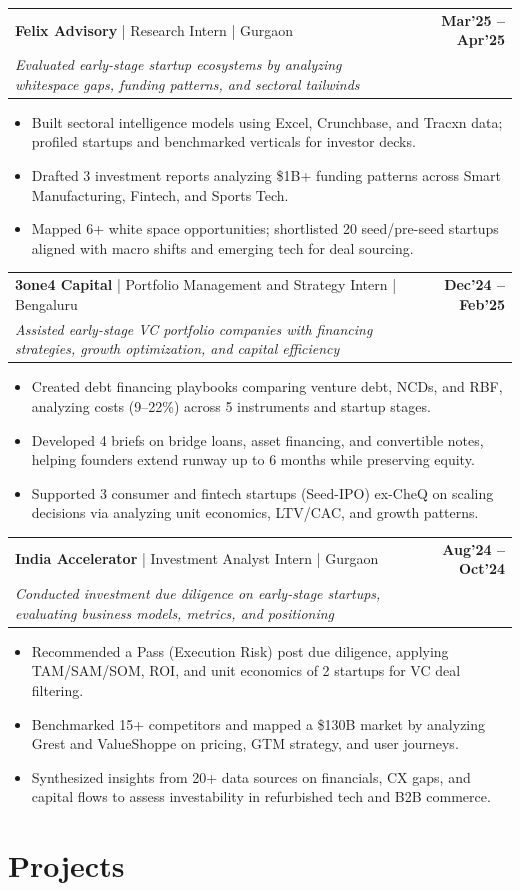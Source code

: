 \documentclass[10pt, a4paper]{article}
\makeatletter
\newcommand{\jobheader}[4]{
  \vspace{-1pt}
  \begin{tabular*}{\textwidth}[t]{l@{\extracolsep{\fill}}r}
    \textbf{#1} \quad | \quad #3 & \textbf{\small #4} \\
    \textit{\small #2} & \\
  \end{tabular*}
  \vspace{-2pt}
}
\newenvironment{achievelist}{
  \begin{itemize}[leftmargin=1.2em, itemsep=0.5pt, parsep=0pt, topsep=1pt]
    \small
}{
  \end{itemize}
  \vspace{-2pt}
}
\newcommand{\achieve}[1]{\item #1}
\makeatother
\begin{document}
\jobheader{Felix Advisory}{Evaluated early-stage startup ecosystems by analyzing whitespace gaps, funding patterns, and sectoral tailwinds}{Research Intern | Gurgaon}{Mar'25 -- Apr'25}
\begin{achievelist}
  \achieve{Built sectoral intelligence models using Excel, Crunchbase, and Tracxn data; profiled startups and benchmarked verticals for investor decks.}
  \achieve{Drafted 3 investment reports analyzing \$1B+ funding patterns across Smart Manufacturing, Fintech, and Sports Tech.}
  \achieve{Mapped 6+ white space opportunities; shortlisted 20 seed/pre-seed startups aligned with macro shifts and emerging tech for deal sourcing.}
\end{achievelist}

\jobheader{3one4 Capital}{Assisted early-stage VC portfolio companies with financing strategies, growth optimization, and capital efficiency}{Portfolio Management and Strategy Intern | Bengaluru}{Dec'24 -- Feb'25}
\begin{achievelist}
  \achieve{Created debt financing playbooks comparing venture debt, NCDs, and RBF, analyzing costs (9--22\%) across 5 instruments and startup stages.}
  \achieve{Developed 4 briefs on bridge loans, asset financing, and convertible notes, helping founders extend runway up to 6 months while preserving equity.}
  \achieve{Supported 3 consumer and fintech startups (Seed-IPO) ex-CheQ on scaling decisions via analyzing unit economics, LTV/CAC, and growth patterns.}
\end{achievelist}

\jobheader{India Accelerator}{Conducted investment due diligence on early-stage startups, evaluating business models, metrics, and positioning}{Investment Analyst Intern | Gurgaon}{Aug'24 -- Oct'24}
\begin{achievelist}
  \achieve{Recommended a Pass (Execution Risk) post due diligence, applying TAM/SAM/SOM, ROI, and unit economics of 2 startups for VC deal filtering.}
  \achieve{Benchmarked 15+ competitors and mapped a \$130B market by analyzing Grest and ValueShoppe on pricing, GTM strategy, and user journeys.}
  \achieve{Synthesized insights from 20+ data sources on financials, CX gaps, and capital flows to assess investability in refurbished tech and B2B commerce.}
\end{achievelist}

\vspace{-2pt}

\section{Projects}
\end{document}
